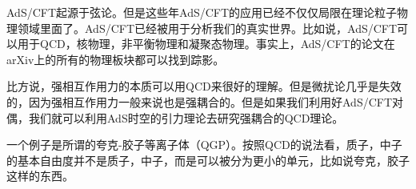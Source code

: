 
AdS/CFT起源于弦论。但是这些年AdS/CFT的应用已经不仅仅局限在理论粒子物理领域里面了。AdS/CFT已经被用于分析我们的真实世界。比如说，AdS/CFT可以用于QCD，核物理，非平衡物理和凝聚态物理。事实上，AdS/CFT的论文在arXiv上的所有的物理板块都可以找到踪影。

比方说，强相互作用力的本质可以用QCD来很好的理解。但是微扰论几乎是失效的，因为强相互作用力一般来说也是强耦合的。但是如果我们利用好AdS/CFT对偶，我们就可以利用AdS时空的引力理论去研究强耦合的QCD理论。

一个例子是所谓的夸克-胶子等离子体（QGP）。按照QCD的说法看，质子，中子的基本自由度并不是质子，中子，而是可以被分为更小的单元，比如说夸克，胶子这样的东西。